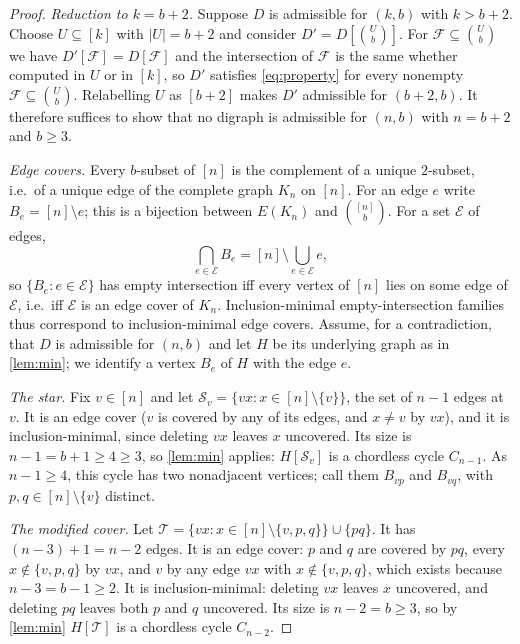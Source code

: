 \documentclass[11pt,a4paper]{article}
\theoremstyle{plain}
\theoremstyle{definition}
\theoremstyle{remark}
\newcommand{\cF}{\mathcal F}
\newcommand{\cS}{\mathcal S}
\newcommand{\cT}{\mathcal T}
\newcommand{\cE}{\mathcal E}
\begin{document}
\label{pf:neg}
\propneg*
\begin{proof}
\emph{Reduction to $k=b+2$.} Suppose $D$ is admissible for $(k,b)$ with $k>b+2$. Choose $U\subseteq[k]$ with $|U|=b+2$ and consider $D'=D[\binom{U}{b}]$. For $\cF\subseteq\binom Ub$ we have $D'[\cF]=D[\cF]$ and the intersection of $\cF$ is the same whether computed in $U$ or in $[k]$, so $D'$ satisfies \eqref{eq:property} for every nonempty $\cF\subseteq\binom Ub$. Relabelling $U$ as $[b+2]$ makes $D'$ admissible for $(b+2,b)$. It therefore suffices to show that no digraph is admissible for $(n,b)$ with $n=b+2$ and $b\ge3$.

\emph{Edge covers.} Every $b$-subset of $[n]$ is the complement of a unique $2$-subset, i.e.\ of a unique edge of the complete graph $K_n$ on $[n]$. For an edge $e$ write $B_e=[n]\setminus e$; this is a bijection between $E(K_n)$ and $\binom{[n]}{b}$. For a set $\cE$ of edges,
\[
 \bigcap_{e\in\cE}B_e=[n]\setminus\bigcup_{e\in\cE}e,
\]
so $\{B_e:e\in\cE\}$ has empty intersection iff every vertex of $[n]$ lies on some edge of $\cE$, i.e.\ iff $\cE$ is an edge cover of $K_n$. Inclusion-minimal empty-intersection families thus correspond to inclusion-minimal edge covers. Assume, for a contradiction, that $D$ is admissible for $(n,b)$ and let $H$ be its underlying graph as in \cref{lem:min}; we identify a vertex $B_e$ of $H$ with the edge $e$.

\emph{The star.} Fix $v\in[n]$ and let $\cS_v=\{vx:x\in[n]\setminus\{v\}\}$, the set of $n-1$ edges at $v$. It is an edge cover ($v$ is covered by any of its edges, and $x\ne v$ by $vx$), and it is inclusion-minimal, since deleting $vx$ leaves $x$ uncovered. Its size is $n-1=b+1\ge4\ge3$, so \cref{lem:min} applies: $H[\cS_v]$ is a chordless cycle $C_{n-1}$. As $n-1\ge4$, this cycle has two nonadjacent vertices; call them $B_{vp}$ and $B_{vq}$, with $p,q\in[n]\setminus\{v\}$ distinct.

\emph{The modified cover.} Let $\cT=\{vx:x\in[n]\setminus\{v,p,q\}\}\cup\{pq\}$. It has $(n-3)+1=n-2$ edges. It is an edge cover: $p$ and $q$ are covered by $pq$, every $x\notin\{v,p,q\}$ by $vx$, and $v$ by any edge $vx$ with $x\notin\{v,p,q\}$, which exists because $n-3=b-1\ge2$. It is inclusion-minimal: deleting $vx$ leaves $x$ uncovered, and deleting $pq$ leaves both $p$ and $q$ uncovered. Its size is $n-2=b\ge3$, so by \cref{lem:min} $H[\cT]$ is a chordless cycle $C_{n-2}$.


\end{proof}
\end{document}
